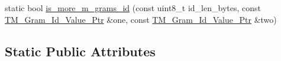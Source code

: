 \begin{DoxyCompactItemize}
\item 
static bool \hyperlink{classuva_1_1smt_1_1bpbd_1_1server_1_1lm_1_1m__grams_1_1m__gram__id_1_1_byte___m___gram___id_a088a9d8e8f66d09fb10f2304fe0abdc0}{is\+\_\+more\+\_\+m\+\_\+grams\+\_\+id} (const uint8\+\_\+t id\+\_\+len\+\_\+bytes, const \hyperlink{namespaceuva_1_1smt_1_1bpbd_1_1server_1_1lm_1_1m__grams_1_1m__gram__id_aa605051ded9336178d905e9581702378}{T\+M\+\_\+\+Gram\+\_\+\+Id\+\_\+\+Value\+\_\+\+Ptr} \&one, const \hyperlink{namespaceuva_1_1smt_1_1bpbd_1_1server_1_1lm_1_1m__grams_1_1m__gram__id_aa605051ded9336178d905e9581702378}{T\+M\+\_\+\+Gram\+\_\+\+Id\+\_\+\+Value\+\_\+\+Ptr} \&two)
\end{DoxyCompactItemize}
\subsection*{Static Public Attributes}
